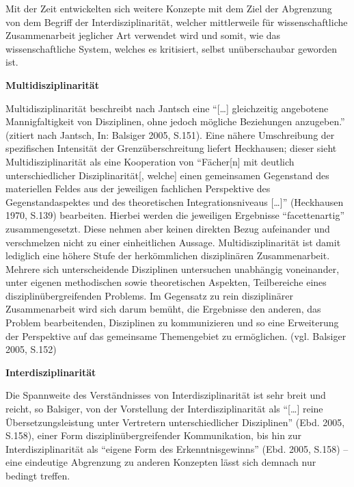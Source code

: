 \documentclass[a4paper,
fontsize=11pt,
oneside,
numbers=noperiodatend,
parskip=half-,
bibliography=totoc,
final
]{scrartcl}
\begin{document}
Mit der Zeit entwickelten sich weitere Konzepte mit dem Ziel der
Abgrenzung von dem Begriff der Interdisziplinarität, welcher
mittlerweile für wissenschaftliche Zusammenarbeit jeglicher Art
verwendet wird und somit, wie das wissenschaftliche System, welches es
kritisiert, selbst unüberschaubar geworden ist.

\textbf{Multidisziplinarität}

Multidisziplinarität beschreibt nach Jantsch eine
\enquote{{[}\ldots{}{]} gleichzeitig angebotene Mannigfaltigkeit von
Disziplinen, ohne jedoch mögliche Beziehungen anzugeben.} (zitiert nach
Jantsch, In: Balsiger 2005, S.151). Eine nähere Umschreibung der
spezifischen Intensität der Grenzüberschreitung liefert Heckhausen;
dieser sieht Multidisziplinarität als eine Kooperation von
\enquote{Fächer{[}n{]} mit deutlich unterschiedlicher
Disziplinarität{[}, welche{]} einen gemeinsamen Gegenstand des
materiellen Feldes aus der jeweiligen fachlichen Perspektive des
Gegenstandaspektes und des theoretischen Integrationsniveaus
{[}\ldots{}{]}} (Heckhausen 1970, S.139) bearbeiten. Hierbei werden die
jeweiligen Ergebnisse \enquote{facettenartig} zusammengesetzt. Diese
nehmen aber keinen direkten Bezug aufeinander und verschmelzen nicht zu
einer einheitlichen Aussage. Multidisziplinarität ist damit lediglich
eine höhere Stufe der herkömmlichen disziplinären Zusammenarbeit.
Mehrere sich unterscheidende Disziplinen untersuchen unabhängig
voneinander, unter eigenen methodischen sowie theoretischen Aspekten,
Teilbereiche eines disziplinübergreifenden Problems. Im Gegensatz zu
rein disziplinärer Zusammenarbeit wird sich darum bemüht, die Ergebnisse
den anderen, das Problem bearbeitenden, Disziplinen zu kommunizieren und
so eine Erweiterung der Perspektive auf das gemeinsame Themengebiet zu
ermöglichen. (vgl. Balsiger 2005, S.152)

\textbf{Interdisziplinarität}

Die Spannweite des Verständnisses von Interdisziplinarität ist sehr
breit und reicht, so Balsiger, von der Vorstellung der
Interdisziplinarität als \enquote{{[}\ldots{}{]} reine
Übersetzungsleistung unter Vertretern unterschiedlicher Disziplinen}
(Ebd. 2005, S.158), einer Form disziplinübergreifender Kommunikation,
bis hin zur Interdisziplinarität als \enquote{eigene Form des
Erkenntnisgewinns} (Ebd. 2005, S.158) -- eine eindeutige Abgrenzung zu
anderen Konzepten lässt sich demnach nur bedingt treffen.
\end{document}
